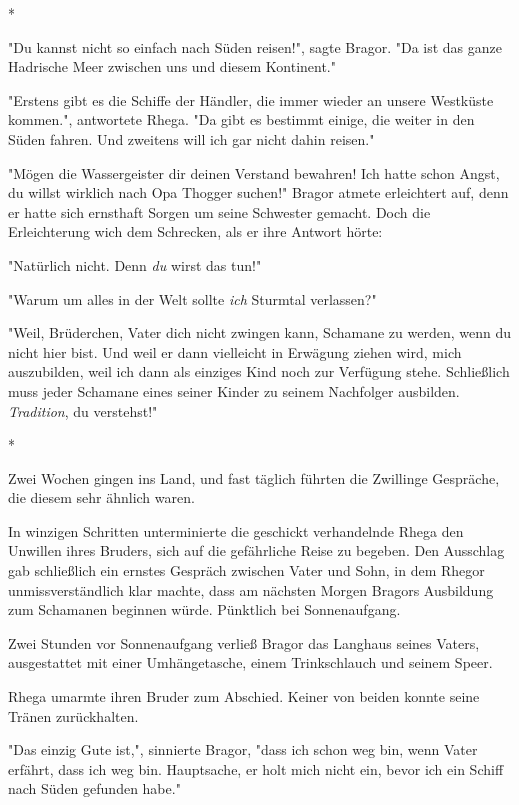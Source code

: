 \documentclass[10pt, a4paper, oneside]{book}
\begin{document}
\begin{multicols}{2}
\begin{center}
    *
\end{center}

"Du kannst nicht so einfach nach Süden reisen!", sagte Bragor. "Da ist das  ganze Hadrische Meer zwischen uns und diesem Kontinent."

"Erstens gibt es die Schiffe der Händler, die immer wieder an unsere Westküste  kommen.", antwortete Rhega. "Da gibt es bestimmt einige, die weiter in den Süden fahren. Und zweitens will ich gar nicht dahin reisen." 

"Mögen die Wassergeister dir deinen Verstand bewahren! Ich hatte schon Angst, du willst wirklich nach Opa Thogger suchen!" Bragor atmete erleichtert auf, denn er hatte sich ernsthaft Sorgen um seine Schwester gemacht. Doch die Erleichterung wich dem Schrecken, als er ihre Antwort hörte: 

"Natürlich nicht. Denn \textit{du} wirst das tun!"

"Warum um alles in der Welt sollte \textit{ich} Sturmtal verlassen?"

"Weil, Brüderchen, Vater dich nicht zwingen kann, Schamane zu werden, wenn du nicht hier bist. Und weil er dann vielleicht in Erwägung ziehen wird, mich auszubilden, weil ich dann als einziges Kind noch zur Verfügung stehe. Schließlich muss jeder Schamane eines seiner Kinder zu seinem Nachfolger ausbilden. \textit{Tradition}, du verstehst!" 

\begin{center}
    *
\end{center}

Zwei Wochen gingen ins Land, und fast täglich führten die Zwillinge Gespräche, die diesem sehr ähnlich waren.

In winzigen Schritten unterminierte die geschickt verhandelnde Rhega den Unwillen ihres Bruders, sich auf die gefährliche Reise zu begeben. Den Ausschlag gab schließlich ein ernstes Gespräch zwischen Vater und Sohn, in dem Rhegor unmissverständlich klar machte, dass am nächsten Morgen Bragors Ausbildung zum Schamanen beginnen würde. Pünktlich bei Sonnenaufgang. 

Zwei Stunden vor Sonnenaufgang verließ Bragor das Langhaus seines Vaters, ausgestattet mit einer Umhängetasche, einem Trinkschlauch und seinem Speer. 

Rhega umarmte ihren Bruder zum Abschied. Keiner von beiden konnte seine Tränen zurückhalten. 

"Das einzig Gute ist,", sinnierte Bragor, "dass ich schon weg bin, wenn Vater erfährt, dass ich weg bin. Hauptsache, er holt mich nicht ein, bevor ich ein Schiff nach Süden gefunden habe." 


\end{multicols}
\end{document}
